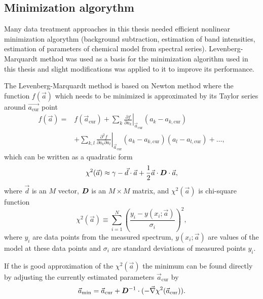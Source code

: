 \subsection{Minimization algorythm}

Many data treatment approaches in this thesis needed efficient nonlinear
minimization algorythm (background subtraction, estimation of band intensities,
estimation of parameters of chemical model from spectral series).
Levenberg-Marquardt method
\parencite{Marquardt1963}
was used as a basis for the minimization algorithm used in this thesis and
slight modifications was applied to it to improve its performance.

The Levenberg-Marquardt method is based on Newton method where
the function $f(\vec{a})$ which needs to be minimized is approximated by its
Taylor series around $\vec{a_\text{cur}}$ point
\begin{align*}
	f(\vec{a}) =& f(\vec{a}_\text{cur})
		+ \sum_k \left.\frac{\partial{}f}{\partial{}a_k}\right
			\rvert_{\vec{a}_\text{cur}}(a_k - a_{k,\text{cur}})\\
		&+ \sum_{k,l} \left.\frac{
			\partial^2f
		}{
			\partial{}a_k\partial{}a_l
		}\right\rvert_{\vec{a}_\text{cur}}
		(a_k - a_{k,\text{cur}})(a_l - a_{l,\text{cur}})
		+ \dots,
\end{align*}
which can be written as a quadratic form
\begin{equation}
	\chi^2(\vec{a}) \approx
		\gamma
		- \vec{d}\cdot\vec{a}
		+ \frac{1}{2}\vec{a}\cdot{}\mat{D}\cdot\vec{a},
	\label{\eqnlabel{minimization:chi_approx}}
\end{equation}
where $\vec{d}$ is an $M$ vector, $\mat{D}$ is an $M\times{}M$ matrix, and
$\chi^2(\vec{a})$ is chi-square function
\begin{equation*}
	\chi^2(\vec{a}) \equiv \sum_{i=1}^N\left(
			\frac{y_i - y(x_i;\vec{a})}{\sigma_i}
	\right)^2,
\end{equation*}
where $y_i$ are data points from the measured spectrum,
$y(x_i;\vec{a})$ are values of the model at these data points and
$\sigma_i$ are standard deviations of measured points $y_i$.

If the
is good approximation of the $\chi^2(\vec{a})$ the minimum can be found
directly by adjusting the currently estimated parameters $\vec{a}_\text{cur}$
by
\begin{equation}
	\vec{a}_\text{min} = \vec{a}_\text{cur}
		+ \mat{D}^{-1}\cdot(-\vec{\nabla}\chi^2(\vec{a}_\text{cur})).
	\label{\eqnlabel{minimization:newton_min}}
\end{equation}

